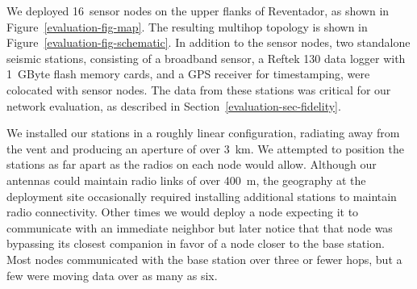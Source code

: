 We deployed 16~sensor nodes on the upper flanks of Reventador, as shown in
Figure~\ref{evaluation-fig-map}. The resulting multihop topology is shown in
Figure~\ref{evaluation-fig-schematic}. In addition to the sensor nodes, two
standalone seismic stations, consisting of a broadband sensor, a Reftek 130
data logger with 1~GByte flash memory cards, and a GPS receiver for
timestamping, were colocated with sensor nodes. The data from these stations
was critical for our network evaluation, as described in
Section~\ref{evaluation-sec-fidelity}.

We installed our stations in a roughly linear configuration, radiating away
from the vent and producing an aperture of over 3~km. We attempted to
position the stations as far apart as the radios on each node would allow.
Although our antennas could maintain radio links of over 400~m, the geography
at the deployment site occasionally required installing additional stations
to maintain radio connectivity. Other times we would deploy a node expecting
it to communicate with an immediate neighbor but later notice that that node
was bypassing its closest companion in favor of a node closer to the base
station. Most nodes communicated with the base station over three or fewer
hops, but a few were moving data over as many as six.
